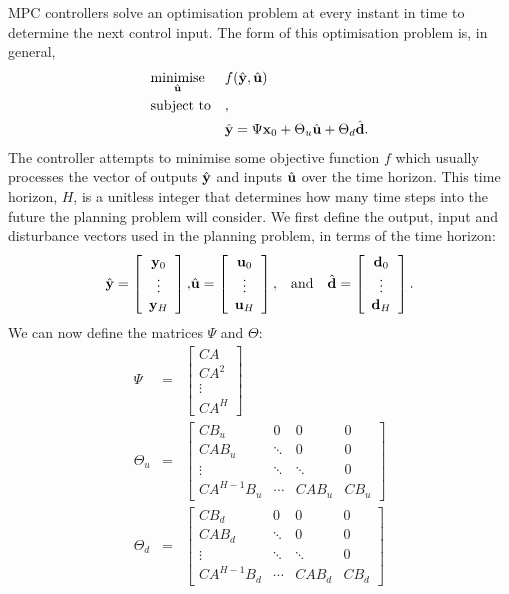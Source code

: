 MPC controllers solve an optimisation problem at every instant in time to determine the next control input.
The form of this optimisation problem is, in general,
\begin{equation}
	\label{eq:mpc-opt}
	\optimise
		{minimise}{\hvec{u}}
		{f(\hvec{y}, \hvec{u})}
		{\hvec{y} = \Psi \vec{x}_0 + \Theta_u \hvec{u} + \Theta_d \hvec{d}}
\end{equation}
The controller attempts to minimise some objective function $f$ which usually processes the vector of outputs $\hat{\mathbf{y}}$ and inputs $\hat{\mathbf{u}}$ over the time horizon.
This time horizon, $H$, is a unitless integer that determines how many time steps into the future the planning problem will consider.
We first define the output, input and disturbance vectors used in the planning problem, in terms of the time horizon:
\begin{eqnarray}
	\label{eq:mpc-vectors}
	\hat{\mathbf{y}} = \left[\begin{array}{c}
		\mathbf{y}_0 \\
		\vdots \\
		\mathbf{y}_H
	\end{array}\right],
	&
	\hat{\mathbf{u}} = \left[\begin{array}{c}
		\mathbf{u}_0 \\
		\vdots \\
		\mathbf{u}_H
	\end{array}\right],
	& \text{and} \quad
	\hat{\mathbf{d}} = \left[\begin{array}{c}
		\mathbf{d}_0 \\
		\vdots \\
		\mathbf{d}_H
	\end{array}\right].
\end{eqnarray}
We can now define the matrices $\Psi$ and $\Theta$:
\begin{eqnarray}
	\label{eq:mpc-psi}
	\Psi &=& \left[\begin{array}{c}
		CA \\ CA^2 \\ \vdots \\ CA^H
	\end{array}\right]
	\\\label{eq:mpc-theta-u}
	\Theta_u &=& \left[\begin{array}{cccc}
		CB_u & 0 & 0 & 0 \\
		CAB_u & \ddots & 0 & 0 \\
		\vdots & \ddots & \ddots & 0 \\
		CA^{H-1}B_u & \cdots & CAB_u & CB_u
	\end{array}\right]
	\\\label{eq:mpc-theta-d}
	\Theta_d &=& \left[\begin{array}{cccc}
		CB_d & 0 & 0 & 0 \\
		CAB_d & \ddots & 0 & 0 \\
		\vdots & \ddots & \ddots & 0 \\
		CA^{H-1}B_d & \cdots & CAB_d & CB_d
	\end{array}\right]
\end{eqnarray}

